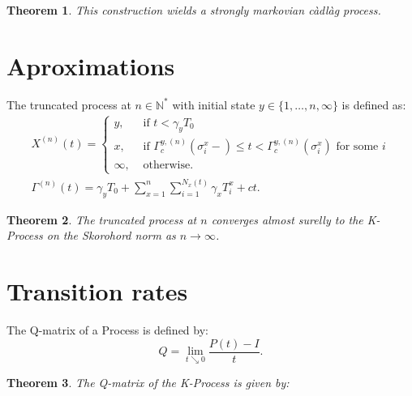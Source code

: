 \documentclass[a1,portrait]{a0poster}
\newtheorem*{teorema}{Theorem}
\newcommand{\Nz}{{\mathbb{N^*}}}
\begin{document}
\begin{textblock}{15}
  \begin{teorema}
    This construction wields a strongly markovian càdlàg process.
  \end{teorema}


  \section{Aproximations}

  The truncated process at $n \in \Nz$ with initial state $y \in \{1,
  \ldots, n, \infty\}$ is defined as:
  \begin{gather*}
    X^{(n)}(t) = \begin{cases}
      y, & \textrm{ if }  t < \gamma_y T_0 \\
      x, & \textrm{ if } \Gamma^{y,(n)}_c(\sigma_i^x-) \leq t <
      \Gamma^{y,(n)}_c(\sigma^x_i)
      \textrm{ for some } i \\
      \infty, & \textrm{ otherwise.}
    \end{cases}\\
    \Gamma^{(n)} (t) = \gamma_y T_0
    + \sum_{x =1}^{n} \sum_{i = 1}^{N_x(t)}
    \gamma_x T_i^x
    + ct.
  \end{gather*}

  \begin{teorema}
    The truncated process at $n$ converges almost surelly to the
    K-Process on the Skorohord norm as $n \to \infty$.
  \end{teorema}

  \section{Transition rates}

  The Q-matrix of a Process is defined by:
  \begin{displaymath}
    Q = \lim_{t \searrow 0} \frac{P(t) - I}{t}.
  \end{displaymath}

  \begin{teorema}
    The Q-matrix of the K-Process is given by:


\end{teorema}
\end{textblock}
\end{document}
